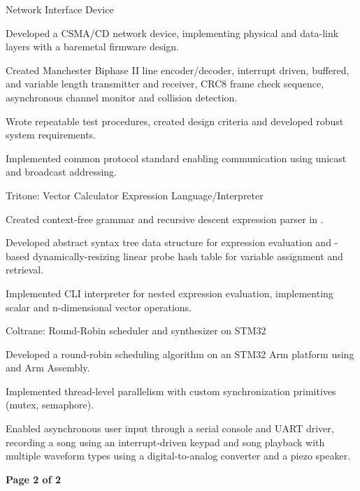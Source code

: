 \documentclass[11pt]{article}
\begin{document}
\sectionproj
{Network Interface Device} 
{\begin{circlist}
	\item Developed a CSMA/CD network device, implementing physical and data-link layers with a baremetal firmware design.
	\item Created Manchester Biphase II line encoder/decoder, interrupt driven, buffered, and variable length transmitter and receiver, CRC8 frame check sequence, asynchronous channel monitor and collision detection.
	\item Wrote repeatable test procedures, created design criteria and developed robust system requirements.
	\item Implemented common protocol standard enabling communication using unicast and broadcast addressing.
\end{circlist}}

\sectionproj
{Tritone: Vector Calculator Expression Language/Interpreter} 
{\begin{circlist}
	\item Created context-free grammar and recursive descent expression parser in .
	\item Developed abstract syntax tree data structure for expression evaluation and -based dynamically-resizing linear probe hash table for variable assignment and retrieval.
	\item Implemented CLI interpreter for nested expression evaluation, implementing scalar and n-dimensional vector operations. 
\end{circlist}}

\sectionproj
{Coltrane: Round-Robin scheduler and synthesizer on STM32} 
{\begin{circlist}
	\item Developed a round-robin scheduling algorithm on an STM32 Arm platform using  and Arm Assembly.
	\item Implemented thread-level parallelism with custom synchronization primitives (mutex, semaphore).
	\item Enabled asynchronous user input through a serial console and UART driver, recording a song using an interrupt-driven keypad and song playback with multiple waveform types using a digital-to-analog converter and a piezo speaker. 
\end{circlist}}
\rootend


\begin{indentsection}
\end{indentsection}

\vfill
\hfill {\bfseries{Page 2 of 2}}
\end{document}
